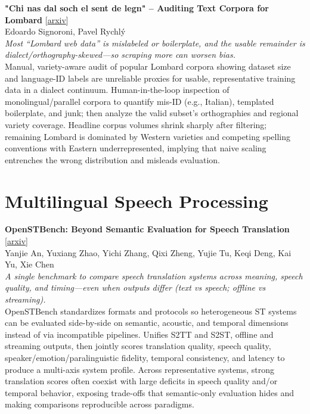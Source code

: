 \documentclass[12pt,letterpaper]{article}
\begin{document}
\medskip

{\small\textbf{"Chi nas dal soch el sent de legn" -- Auditing Text Corpora for Lombard}} {\scriptsize[\href{https://arxiv.org/abs/2606.06349}{arxiv}]}\\
{\scriptsize Edoardo Signoroni, Pavel Rychlý}\\

{\small\textit{Most ``Lombard web data'' is mislabeled or boilerplate, and the usable remainder is dialect/orthography-skewed---so scraping more can worsen bias.}}\\[1pt]
{\footnotesize Manual, variety-aware audit of popular Lombard corpora showing dataset size and language-ID labels are unreliable proxies for usable, representative training data in a dialect continuum. Human-in-the-loop inspection of monolingual/parallel corpora to quantify mis-ID (e.g., Italian), templated boilerplate, and junk; then analyze the valid subset's orthographies and regional variety coverage. Headline corpus volumes shrink sharply after filtering; remaining Lombard is dominated by Western varieties and competing spelling conventions with Eastern underrepresented, implying that naive scaling entrenches the wrong distribution and misleads evaluation.}

\medskip


\section*{Multilingual Speech Processing}

{\small\textbf{OpenSTBench: Beyond Semantic Evaluation for Speech Translation}} {\scriptsize[\href{https://arxiv.org/abs/2605.30792}{arxiv}]}\\
{\scriptsize Yanjie An, Yuxiang Zhao, Yichi Zhang, Qixi Zheng, Yujie Tu, Keqi Deng, Kai Yu, Xie Chen}\\

{\small\textit{A single benchmark to compare speech translation systems across meaning, speech quality, and timing---even when outputs differ (text vs speech; offline vs streaming).}}\\[1pt]
{\footnotesize OpenSTBench standardizes formats and protocols so heterogeneous ST systems can be evaluated side-by-side on semantic, acoustic, and temporal dimensions instead of via incompatible pipelines. Unifies S2TT and S2ST, offline and streaming outputs, then jointly scores translation quality, speech quality, speaker/emotion/paralinguistic fidelity, temporal consistency, and latency to produce a multi-axis system profile. Across representative systems, strong translation scores often coexist with large deficits in speech quality and/or temporal behavior, exposing trade-offs that semantic-only evaluation hides and making comparisons reproducible across paradigms.}
\end{document}
